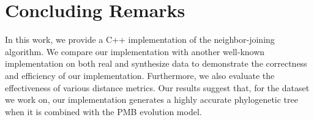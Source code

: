 \documentclass[11pt,letterpaper]{article}
\theoremstyle{definition}
\begin{document}
\section{Concluding Remarks}

In this work, we provide a C++ implementation of the neighbor-joining algorithm. We compare our implementation with another well-known implementation on both real and synthesize data to demonstrate the correctness and efficiency of our implementation. Furthermore, we also evaluate the effectiveness of various distance metrics. Our results suggest that, for the dataset we work on, our implementation generates a highly accurate phylogenetic tree when it is combined with the PMB evolution model.




\end{document}
